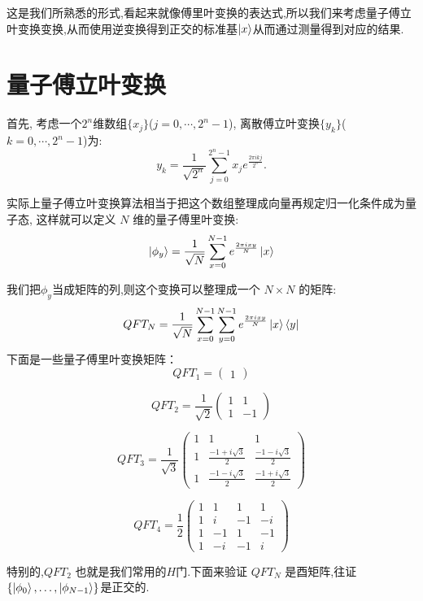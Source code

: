 这是我们所熟悉的形式,看起来就像傅里叶变换的表达式,所以我们来考虑量子傅立叶变换变换,从而使用逆变换得到正交的标准基$\ket{x}$从而通过测量得到对应的结果.


\section{量子傅立叶变换}
首先, 考虑一个$2^n$维数组$\{x_j\}$($j=0, \cdots, 2^n-1$), 离散傅立叶变换$\{y_k\}$($k=0, \cdots, 2^n-1$)为:
\begin{equation}
	y_k = \frac{1}{\sqrt{2^n}} \sum_{j=0}^{2^n-1} x_j e^{\frac{2\pi i kj}{2^n}}.
\end{equation}

实际上量子傅立叶变换算法相当于把这个数组整理成向量再规定归一化条件成为量子态, 这样就可以定义 $N$ 维的量子傅里叶变换:
\begin{equation}
	\ket{\phi_y} = \frac{1}{\sqrt{N}} \sum_{x=0}^{N-1} e^{\frac{2\pi i xy}{N}} \ket{x}
\end{equation}

我们把$\phi_y$当成矩阵的列,则这个变换可以整理成一个 $N \times N$ 的矩阵:
\begin{equation}
	QFT_N = \frac{1}{\sqrt{N}} \sum_{x=0}^{N-1} \sum_{y=0}^{N-1} e^{\frac{2\pi i xy}{N}} \ket{x} \bra{y}
\end{equation}
下面是一些量子傅里叶变换矩阵：
\[
QFT_1 = \begin{pmatrix} 1 \end{pmatrix}
\]

\[
QFT_2 = \frac{1}{\sqrt{2}} \begin{pmatrix} 1 & 1 \\ 1 & -1 \end{pmatrix}
\]

\[
QFT_3 = \frac{1}{\sqrt{3}} \begin{pmatrix}
	1 & 1 & 1 \\
	1 & \frac{-1 + i \sqrt{3}}{2} & \frac{-1 - i \sqrt{3}}{2} \\
	1 & \frac{-1 - i \sqrt{3}}{2} & \frac{-1 + i \sqrt{3}}{2}
\end{pmatrix}
\]

\[
QFT_4 = \frac{1}{2} \begin{pmatrix} 1 & 1 & 1 & 1 \\ 1 & i & -1 & -i \\ 1 & -1 & 1 & -1 \\ 1 & -i & -1 & i \end{pmatrix}
\]

特别的,$QFT_2$ 也就是我们常用的$H$门.下面来验证 $QFT_N$ 是酉矩阵,往证$\{ \ket{\phi_0}, \dots, \ket{\phi_{N-1}} \}$是正交的.

